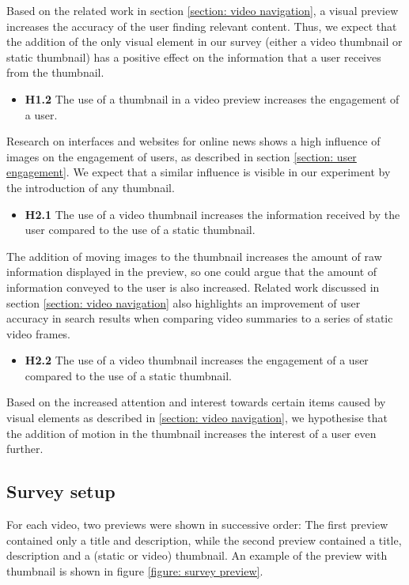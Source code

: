 \documentclass{../resources/sig-alternate-05-2015}
\begin{document}
Based on the related work in section \ref{section: video navigation}, a visual preview increases the accuracy of the user finding relevant content. Thus, we expect that the addition of the only visual element in our survey (either a video thumbnail or static thumbnail) has a positive effect on the information that a user receives from the thumbnail.

\begin{itemize}
	\item \textbf{H1.2} The use of a thumbnail in a video preview increases the engagement of a user.
\end{itemize}

Research on interfaces and websites for online news shows a high influence of images on the engagement of users, as described in section \ref{section: user engagement}. We expect that a similar influence is visible in our experiment by the introduction of any thumbnail.

\begin{itemize}
	\item \textbf{H2.1} The use of a video thumbnail increases the information received by the user compared to the use of a static thumbnail.
\end{itemize}

The addition of moving images to the thumbnail increases the amount of raw information displayed in the preview, so one could argue that the amount of information conveyed to the user is also increased. Related work discussed in section \ref{section: video navigation} also highlights an improvement of user accuracy in search results when comparing video summaries to a series of static video frames.

\begin{itemize}
	\item \textbf{H2.2} The use of a video thumbnail increases the engagement of a user compared to the use of a static thumbnail.
\end{itemize}

Based on the increased attention and interest towards certain items caused by visual elements as described in \ref{section: video navigation}, we hypothesise that the addition of motion in the thumbnail increases the interest of a user even further.

\subsection{Survey setup}
For each video, two previews were shown in successive order: The first preview contained only a title and description, while the second preview contained a title, description and a (static or video) thumbnail. An example of the preview with thumbnail is shown in figure \ref{figure: survey preview}.
\end{document}
